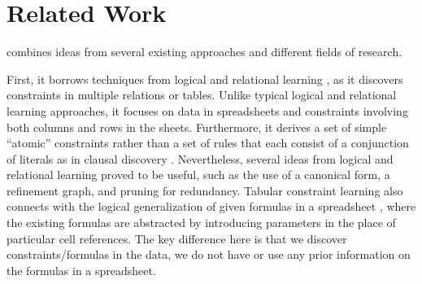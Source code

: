 

\section{Related Work}\label{sec:tacle_related_work}
\sname combines ideas from several existing approaches and different fields of research.

First, it borrows techniques from logical and relational learning \cite{luc_book}, as it discovers
constraints in multiple relations or tables. Unlike typical logical and relational learning
approaches, it focuses on data in spreadsheets and constraints involving both columns and rows in the sheets.
Furthermore, it derives a set of simple ``atomic'' constraints rather than a set of rules that each consist of a conjunction of literals as in clausal discovery \cite{claudien,lallouet}. Nevertheless, several ideas from logical and relational learning
proved to be useful, such as the use of a canonical form, a refinement graph, and pruning for redundancy. Tabular constraint learning also connects with the logical generalization of given formulas in a spreadsheet \cite{Isakowitz}, where the existing formulas are abstracted by introducing parameters in the place of particular cell references. The key difference here is that we discover constraints/formulas in the data, we do not have or use any prior information on the formulas in a spreadsheet.


